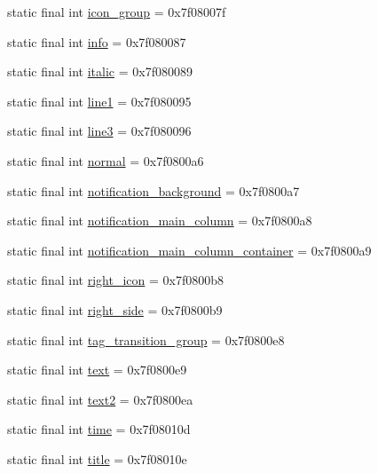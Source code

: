 \begin{DoxyCompactItemize}
\item 
static final int \mbox{\hyperlink{classandroid_1_1support_1_1coreutils_1_1_r_1_1id_a07a2377dc709f9b50bc8a09318b64122}{icon\+\_\+group}} = 0x7f08007f
\item 
static final int \mbox{\hyperlink{classandroid_1_1support_1_1coreutils_1_1_r_1_1id_ae996f4622d90132cfe7f3be798020e06}{info}} = 0x7f080087
\item 
static final int \mbox{\hyperlink{classandroid_1_1support_1_1coreutils_1_1_r_1_1id_a539af34a99b5672098858499696f6cb9}{italic}} = 0x7f080089
\item 
static final int \mbox{\hyperlink{classandroid_1_1support_1_1coreutils_1_1_r_1_1id_a0cff5627ffcbf5f76f88226a5fbef890}{line1}} = 0x7f080095
\item 
static final int \mbox{\hyperlink{classandroid_1_1support_1_1coreutils_1_1_r_1_1id_acd696443c38c57bc37e035129bcb26f2}{line3}} = 0x7f080096
\item 
static final int \mbox{\hyperlink{classandroid_1_1support_1_1coreutils_1_1_r_1_1id_ab1d4420202145fcc0e69eceb35444d40}{normal}} = 0x7f0800a6
\item 
static final int \mbox{\hyperlink{classandroid_1_1support_1_1coreutils_1_1_r_1_1id_a3bce5f3ad761b323a2eb99f303396649}{notification\+\_\+background}} = 0x7f0800a7
\item 
static final int \mbox{\hyperlink{classandroid_1_1support_1_1coreutils_1_1_r_1_1id_a4db238dc74de8db9a5f8c2ee83771e07}{notification\+\_\+main\+\_\+column}} = 0x7f0800a8
\item 
static final int \mbox{\hyperlink{classandroid_1_1support_1_1coreutils_1_1_r_1_1id_aa8cbb39f18ff6181e76ad965e4a63d9f}{notification\+\_\+main\+\_\+column\+\_\+container}} = 0x7f0800a9
\item 
static final int \mbox{\hyperlink{classandroid_1_1support_1_1coreutils_1_1_r_1_1id_a43edd588873f2c79d6ee8ef316cd53db}{right\+\_\+icon}} = 0x7f0800b8
\item 
static final int \mbox{\hyperlink{classandroid_1_1support_1_1coreutils_1_1_r_1_1id_acd6e197cd7abce6c450463b7bc7590a3}{right\+\_\+side}} = 0x7f0800b9
\item 
static final int \mbox{\hyperlink{classandroid_1_1support_1_1coreutils_1_1_r_1_1id_ae42f0d34d784745c92a23554fa19e72f}{tag\+\_\+transition\+\_\+group}} = 0x7f0800e8
\item 
static final int \mbox{\hyperlink{classandroid_1_1support_1_1coreutils_1_1_r_1_1id_a289513fceecd902f29ba1bf996c0afc4}{text}} = 0x7f0800e9
\item 
static final int \mbox{\hyperlink{classandroid_1_1support_1_1coreutils_1_1_r_1_1id_aff851fd667140bcd6dd9d893ab62ca1b}{text2}} = 0x7f0800ea
\item 
static final int \mbox{\hyperlink{classandroid_1_1support_1_1coreutils_1_1_r_1_1id_ad7a7e56ee49aaa67d17b3cb87cf684b2}{time}} = 0x7f08010d
\item 
static final int \mbox{\hyperlink{classandroid_1_1support_1_1coreutils_1_1_r_1_1id_ab9de2d4e17927fd3cbb3594914b602ea}{title}} = 0x7f08010e
\end{DoxyCompactItemize}
